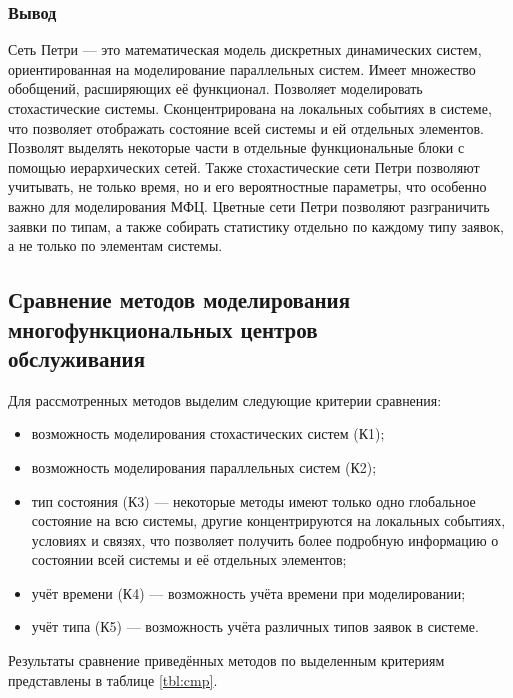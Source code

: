 \subsubsection{Вывод}

Сеть Петри --- это математическая модель дискретных динамических систем, ориентированная на моделирование параллельных систем. Имеет множество обобщений, расширяющих её функционал. Позволяет моделировать стохастические системы. Сконцентрирована на локальных событиях в системе, что позволяет отображать состояние  всей системы и ей отдельных элементов. Позволят выделять некоторые части в отдельные функциональные блоки с помощью иерархических сетей. Также стохастические сети Петри позволяют учитывать, не только время, но и его вероятностные параметры, что особенно важно для моделирования МФЦ. Цветные сети Петри позволяют разграничить заявки по типам, а также собирать статистику отдельно по каждому типу заявок, а не только по элементам системы.

\subsection[Сравнение методов моделирования\\многофункциональных центров обслуживания]{Сравнение методов моделирования\\многофункциональных центров\\обслуживания}

Для рассмотренных методов выделим следующие критерии сравнения:
\begin{itemize}[label=---]
	\item возможность моделирования стохастических систем (К1);
	\item возможность моделирования параллельных систем (К2);
	\item тип состояния (К3) --- некоторые методы имеют только одно глобальное состояние на всю системы, другие концентрируются на локальных событиях, условиях и связях, что позволяет получить более подробную информацию о состоянии всей системы и её отдельных элементов;
	\item учёт времени (К4) --- возможность учёта времени при моделировании;
	\item учёт типа (К5) --- возможность учёта различных типов заявок в системе.
\end{itemize}

Результаты сравнение приведённых методов по выделенным критериям представлены в таблице \ref{tbl:cmp}.

